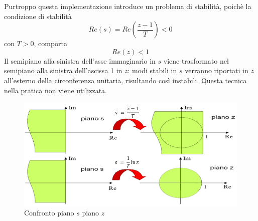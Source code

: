 \documentclass[a4paper]{report}
\begin{document}
Purtroppo questa implementazione introduce un problema di stabilit\`a,
poich\`e la condizione di stabilit\`a
\[
Re(s) = Re \left( \dfrac{z - 1}{T}\right) < 0 
\]
con $T > 0$, comporta
\[
Re(z) < 1
\]
Il semipiano alla sinistra dell'asse immaginario in $s$ viene
trasformato nel semipiano alla sinistra dell'ascissa 1 in $z$:
modi stabili in $s$ verranno riportati in $z$ all'esterno della
circonferenza unitaria, risultando cos\`i instabili. Questa tecnica
nella pratica non viene utilizzata.
\begin{figure}[!h]
  \begin{center}
    \includegraphics[scale=0.4]{./figures/euleroAvanti01.png}
    \caption{Confronto piano $s$ piano $z$}\label{fig:euleroAvanti01}
  \end{center}
\end{figure}
\end{document}
